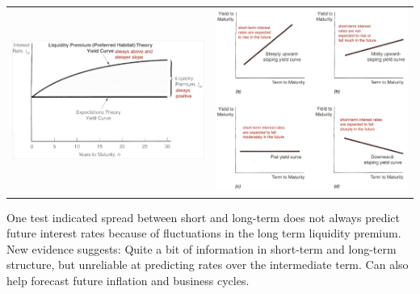 \documentclass[12pt]{examnotes}
\begin{document}
\begin{tabular}{p{} p{}}
  \vspace{0pt} \hspace{-30pt} \includegraphics[scale=0.25]{./imgs/63.jpg}&
  \vspace{0pt} \hspace{-50pt} \includegraphics[scale=0.3]{./imgs/64.jpg}
\end{tabular}


\ra One test indicated spread between short and long-term does not always predict future interest rates because of fluctuations in the long term liquidity premium.
\ra New evidence suggests: Quite a bit of information in short-term and long-term structure, but unreliable at predicting rates over the intermediate term.
\ra Can also help forecast future inflation and business cycles.
\end{document}
